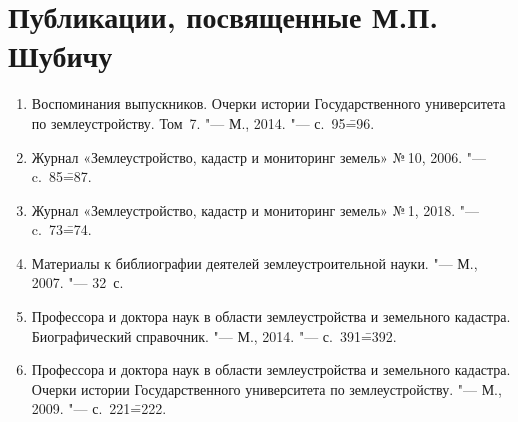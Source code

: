 \section{Публикации, посвященные М.П. Шубичу}
\begin{enumerate}[nosep]
	\item Воспоминания выпускников. Очерки истории Государственного университета по землеустройству. Том~7. "--- М., 2014. "--- с.~95\==96.
	\item Журнал «Землеустройство, кадастр и мониторинг земель» №\,10, 2006. "--- c.~85\==87.
	\item Журнал «Землеустройство, кадастр и мониторинг земель» №\,1, 2018. "--- c.~73\==74.
	\item Материалы к библиографии деятелей землеустроительной науки. "--- М., 2007. "--- 32~с.
	\item Профессора и доктора наук в области землеустройства и земельного кадастра. Биографический справочник. "--- М., 2014. "--- с.~391\==392.
	\item Профессора и доктора наук в области землеустройства и земельного кадастра. Очерки истории Государственного университета по землеустройству. "--- М., 2009. "--- с.~221\==222.
\end{enumerate}